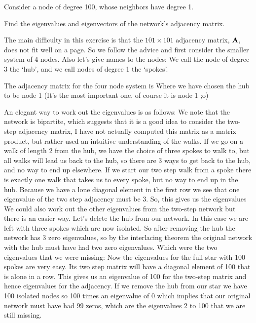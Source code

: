 Consider a node of degree 100, whose neighbors have degree 1.  

\subquestion  
Find the eigenvalues and eigenvectors of the network's adjacency matrix. 


\solution 
The main difficulty in this exercise is that the $101 \times 101$ adjacency matrix, $\bf A$, does not fit well on a page. So we follow the advice and first consider the smaller system of 4 nodes. Also let's give names to the nodes: We call the node of degree 3 the `hub', and we call nodes of degree 1 the `spokes'.

The adjacency matrix for the four node system is 
Where we have chosen the hub to be node 1 (It's the most important one, of course it is node 1 ;o)  

An elegant way to work out the eigenvalues is as follows: We note that the network is bipartite, which suggests that it is a good idea to consider the two-step adjacency matrix, 
I have not actually computed this matrix as a matrix product, but rather used an intuitive understanding of the walks. If we go on a walk of length 2 from the hub, we have the choice of three spokes to walk to, but all walks will lead us back to the hub, so there are 3 ways to get back to the hub, and no way to end up elsewhere. If we start our two step walk from a spoke there is exactly one walk that takes us to every spoke, but no way to end up in the hub. Because we have a lone diagonal element in the first row we see that one eigenvalue of the two step adjacency must be 3. So, this gives us the eigenvalues 
We could also work out the other eigenvalues from the two-step network but there is an easier way. Let's delete the hub from our network. In this case we are left with three spokes which are now isolated. So after removing the hub the network has 3 zero eigenvalues, so by the interlacing theorem the original network with the hub must have had two zero eigenvalues. Which were the two eigenvalues that we were missing: 
Now the eigenvalues for the full star with 100 spokes are very easy. Its two step matrix will have a  diagonal element of 100 that is alone in a row. This gives us an eigenvalue of 100 for the two-step matrix and hence eigenvalues 
for the adjacency. If we remove the hub from our star we have 100 isolated nodes so 100 times an eigenvalue of 0 which implies that our original network must have had 99 zeros, which are the eigenvalues 2 to 100 that we are still missing. 


